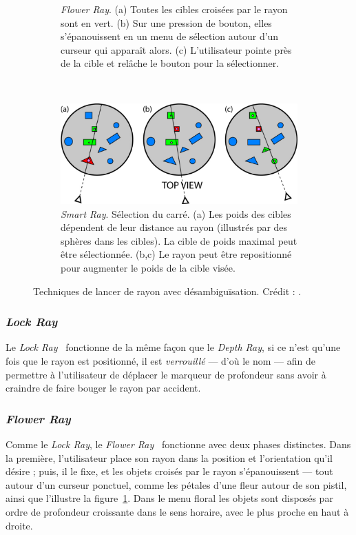 \begin{figure}[htbp]
\begin{subfigure}[t]{\rayWidth}
			\caption{\emph{Flower Ray}. (a) Toutes les cibles croisées par le rayon sont en vert. (b) Sur une pression de bouton, elles s'épanouissent en un menu de sélection autour d'un curseur qui apparaît alors. (c) L'utilisateur pointe près de la cible et relâche le bouton pour la sélectionner.}
			\label{fig:flowerRay}
		\end{subfigure}
		~
		\begin{subfigure}[t]{\rayWidth}
			\centering
			\includegraphics[width=\textwidth]{figures/ch2/smartRay}
			\caption{\emph{Smart Ray}. Sélection du carré. (a) Les poids des cibles dépendent de leur distance au rayon (illustrés par des sphères dans les cibles). La cible de poids maximal peut être sélectionnée. (b,c) Le rayon peut être repositionné pour augmenter le poids de la cible visée.}
			\label{fig:smartRay}
		\end{subfigure}
		\caption[Lancer de rayon avec désambiguïsation]{Techniques de lancer de rayon avec désambiguïsation. Crédit : \cite{grossman2006design}.}
		\label{fig:depthLockFlowerSmartRays}
	\end{figure}
	
	\subsubsection{\emph{Lock Ray}}
	Le \emph{Lock Ray}~\cite{grossman2006design} fonctionne de la même façon que le \emph{Depth Ray}, si ce n'est qu'une fois que le rayon est positionné, il est \emph{verrouillé} --- d'où le nom --- afin de permettre à l'utilisateur de déplacer le marqueur de profondeur sans avoir à craindre de faire bouger le rayon par accident.
	
	\subsubsection{\emph{Flower Ray}}
	Comme le \emph{Lock Ray}, le \emph{Flower Ray}~\cite{grossman2006design} fonctionne avec deux phases distinctes. Dans la première, l'utilisateur place son rayon dans la position et l'orientation qu'il désire ; puis, il le fixe, et les objets croisés par le rayon \og s'épanouissent \fg{}  --- tout autour d'un curseur ponctuel, comme les pétales d'une fleur autour de son pistil, ainsi que l'illustre la figure~\ref{fig:flowerRay}. Dans le menu \og floral \fg{} les objets sont disposés par ordre de profondeur croissante dans le sens horaire, avec le plus proche en haut à droite.
		
